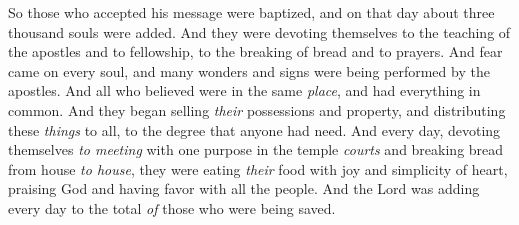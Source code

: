 \begin{biblechapter}
\verse So those who accepted his message were baptized, and on that day about three thousand souls were added.
 And they were devoting themselves to the teaching of the apostles and to fellowship, to the breaking of bread and to prayers.
\verse And fear came on every soul, and many wonders and signs were being performed by the apostles.
\verse And all who believed were in the same \textit{place}, and had everything in common.
\verse And they began selling \textit{their} possessions and property, and distributing these \textit{things} to all, to the degree that anyone had need.
\verse And every day, devoting themselves \textit{to meeting} with one purpose in the temple \textit{courts} and breaking bread from house \textit{to house}, they were eating \textit{their} food with joy and simplicity of heart,
\verse praising God and having favor with all the people. And the Lord was adding every day to the total \textit{of} those who were being saved.
\end{biblechapter}


